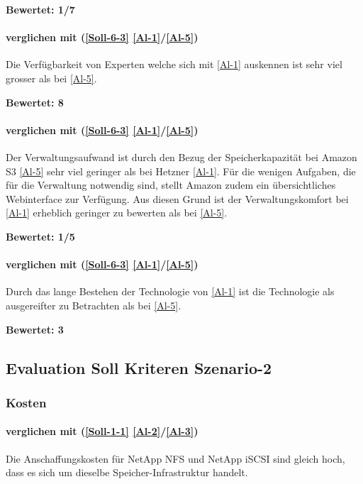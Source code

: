 \textbf{Bewertet: 1/7}

\paragraph*{  verglichen mit  (\ref{Soll-6-3} \ref{Al-1}/\ref{Al-5})} 
Die Verfügbarkeit von Experten welche sich mit \ref{Al-1} auskennen ist sehr viel grosser als bei \ref{Al-5}. 

\textbf{Bewertet: 8}


\paragraph*{  verglichen mit  (\ref{Soll-6-3} \ref{Al-1}/\ref{Al-5})} 
Der Verwaltungsaufwand ist durch den Bezug der Speicherkapazität bei Amazon S3 \ref{Al-5} sehr viel geringer als bei Hetzner \ref{Al-1}. Für die wenigen Aufgaben, die für die Verwaltung notwendig sind, stellt Amazon zudem ein übersichtliches Webinterface zur Verfügung.
Aus diesen Grund ist der Verwaltungskomfort bei \ref{Al-1} erheblich geringer zu bewerten als bei \ref{Al-5}.

\textbf{Bewertet: 1/5}

\paragraph*{  verglichen mit  (\ref{Soll-6-3} \ref{Al-1}/\ref{Al-5})} 
Durch das lange Bestehen der Technologie von \ref{Al-1} ist die Technologie als ausgereifter zu Betrachten als bei \ref{Al-5}.

\textbf{Bewertet: 3}


\subsection{Evaluation Soll Kriteren Szenario-2}

\subsubsection{Kosten}

\paragraph*{  verglichen mit  (\ref{Soll-1-1} \ref{Al-2}/\ref{Al-3})}
Die Anschaffungskosten für NetApp NFS und NetApp iSCSI sind gleich hoch, dass es sich um dieselbe Speicher-Infrastruktur handelt.

